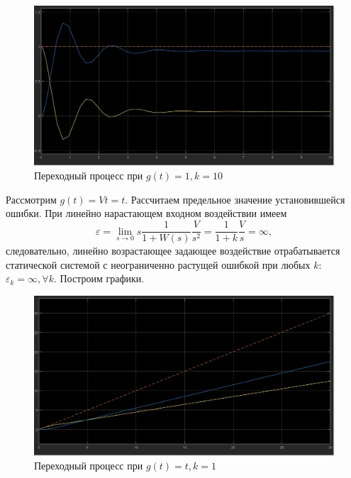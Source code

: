 \documentclass[a4paper, 12pt]{article}
\begin{document}
    \begin{figure}[H]
        \centering
        \includegraphics[scale=0.3]{task_1_g=1_k=10.jpg}
        \captionsetup{skip=0pt}
        \caption{Переходный процесс при $g(t)=1,k=10$}
        \label{fig:t1g1k10}
    \end{figure}
    Рассмотрим $g(t)=Vt=t$. Рассчитаем предельное значение установившейся ошибки.
    При линейно нарастающем входном воздействии имеем
    $$\varepsilon=\lim\limits_{s\rightarrow0}s\dfrac{1}{1+W(s)}\dfrac{V}{s^2}=\dfrac{1}{1+k}\dfrac{V}{s}=\infty,$$
    следовательно, линейно возрастающее задающее воздействие отрабатывается
    статической системой с неограниченно растущей ошибкой при любых $k$: $\varepsilon_k=\infty,\forall k$. Построим графики.
    \begin{figure}[H]
        \centering
        \includegraphics[scale=0.3]{task_1_g=t_k=1.jpg}
        \captionsetup{skip=0pt}
        \caption{Переходный процесс при $g(t)=t,k=1$}
        \label{fig:t1gtk1}
    \end{figure}
\end{document}
